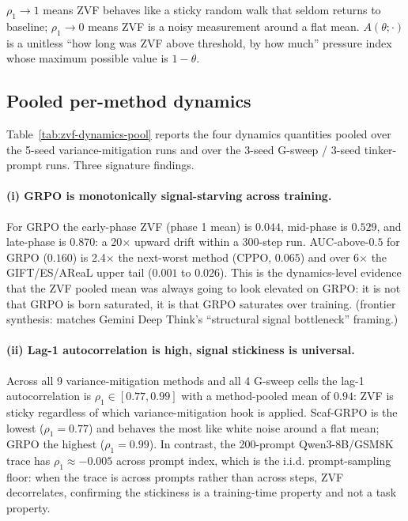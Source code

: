 $\rho_1 \to 1$ means ZVF behaves like a sticky random walk that
seldom returns to baseline; $\rho_1 \to 0$ means ZVF is a noisy
measurement around a flat mean. $A(\theta;\cdot)$ is a unitless
``how long was ZVF above threshold, by how much'' pressure index
whose maximum possible value is $1-\theta$.

\subsection{Pooled per-method dynamics}

Table~\ref{tab:zvf-dynamics-pool} reports the four dynamics quantities
pooled over the 5-seed variance-mitigation runs and over the 3-seed
G-sweep / 3-seed tinker-prompt runs. Three signature findings.

\paragraph{(i) GRPO is monotonically signal-starving across training.}
For GRPO the early-phase ZVF (phase 1 mean) is $0.044$, mid-phase is
$0.529$, and late-phase is $0.870$: a 20$\times$ upward drift within
a 300-step run. AUC-above-$0.5$ for GRPO ($0.160$) is 2.4$\times$ the
next-worst method (CPPO, $0.065$) and over 6$\times$ the GIFT/ES/AReaL
upper tail ($0.001$ to $0.026$). This is the dynamics-level evidence
that the ZVF pooled mean was always going to look elevated on GRPO: it
is not that GRPO is born saturated, it is that GRPO saturates over
training. (frontier synthesis: matches Gemini Deep Think's
``structural signal bottleneck'' framing.)

\paragraph{(ii) Lag-1 autocorrelation is high, signal stickiness is universal.}
Across all 9 variance-mitigation methods and all 4 G-sweep cells the
lag-1 autocorrelation is $\rho_1 \in [0.77, 0.99]$ with a method-pooled
mean of $0.94$: ZVF is sticky regardless of which variance-mitigation
hook is applied. Scaf-GRPO is the lowest ($\rho_1 = 0.77$) and behaves
the most like white noise around a flat mean; GRPO the highest
($\rho_1 = 0.99$). In contrast, the 200-prompt Qwen3-8B/GSM8K trace
has $\rho_1 \approx -0.005$ across prompt index, which is the i.i.d.
prompt-sampling floor: when the trace is across prompts rather than
across steps, ZVF decorrelates, confirming the stickiness is a
training-time property and not a task property.

